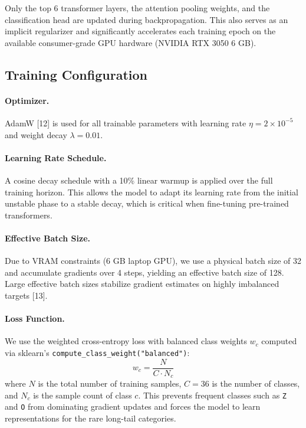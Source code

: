 \documentclass[10pt,a4paper,twocolumn]{article}
\begin{document}
Only the top 6 transformer layers, the attention pooling weights, and the
classification head are updated during backpropagation. This also serves as
an implicit regularizer and significantly accelerates each training epoch on
the available consumer-grade GPU hardware (NVIDIA RTX 3050 6 GB).

\subsection{Training Configuration}

\paragraph{Optimizer.}
AdamW [12] is used for all trainable parameters with learning rate
$\eta = 2 \times 10^{-5}$ and weight decay $\lambda = 0.01$.

\paragraph{Learning Rate Schedule.}
A cosine decay schedule with a 10\% linear warmup is applied over the full
training horizon. This allows the model to adapt its learning rate from the
initial unstable phase to a stable decay, which is critical when fine-tuning
pre-trained transformers.

\paragraph{Effective Batch Size.}
Due to VRAM constraints (6 GB laptop GPU), we use a physical batch size of 32
and accumulate gradients over 4 steps, yielding an effective batch size of 128.
Large effective batch sizes stabilize gradient estimates on highly imbalanced
targets [13].

\paragraph{Loss Function.}
We use the weighted cross-entropy loss with balanced class weights $w_c$
computed via sklearn's \texttt{compute\_class\_weight("balanced")}:
\begin{equation}
  w_c = \frac{N}{C \cdot N_c}
\end{equation}
where $N$ is the total number of training samples, $C = 36$ is the number of
classes, and $N_c$ is the sample count of class $c$. This prevents frequent
classes such as \texttt{Z} and \texttt{O} from dominating gradient updates and
forces the model to learn representations for the rare long-tail categories.
\end{document}
